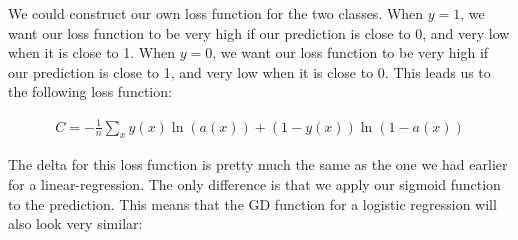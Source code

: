 \documentclass[]{book}
\newenvironment{Shaded}{\begin{snugshade}}{\end{snugshade}}
\newcommand{\CommentTok}[1]{\textcolor[rgb]{0.56,0.35,0.01}{\textit{#1}}}
\newcommand{\ControlFlowTok}[1]{\textcolor[rgb]{0.13,0.29,0.53}{\textbf{#1}}}
\newcommand{\DataTypeTok}[1]{\textcolor[rgb]{0.13,0.29,0.53}{#1}}
\newcommand{\DecValTok}[1]{\textcolor[rgb]{0.00,0.00,0.81}{#1}}
\newcommand{\KeywordTok}[1]{\textcolor[rgb]{0.13,0.29,0.53}{\textbf{#1}}}
\newcommand{\NormalTok}[1]{#1}
\newcommand{\OperatorTok}[1]{\textcolor[rgb]{0.81,0.36,0.00}{\textbf{#1}}}
\newcommand{\StringTok}[1]{\textcolor[rgb]{0.31,0.60,0.02}{#1}}
\begin{document}
We could construct our own loss function for the two classes. When \(y=1\), we want our loss function to be very high if our prediction is close to 0, and very low when it is close to 1. When \(y=0\), we want our loss function to be very high if our prediction is close to 1, and very low when it is close to 0. This leads us to the following loss function:

\[\begin{aligned} 
   C = -\frac{1}{n}\sum_xy(x)\ln(a(x)) + (1 - y(x))\ln(1-a(x))
\end{aligned}\]

The delta for this loss function is pretty much the same as the one we had earlier for a linear-regression. The only difference is that we apply our sigmoid function to the prediction. This means that the GD function for a logistic regression will also look very similar:

\begin{Shaded}
\end{Shaded}
\end{document}
